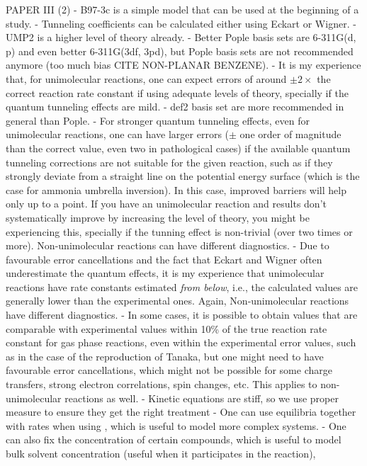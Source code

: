 PAPER III (2)
- B97-3c is a simple model that can be used at the beginning of a study.
- Tunneling coefficients can be calculated either using Eckart or Wigner.
- UMP2 is a higher level of theory already.
- Better Pople basis sets are 6-311G(d, p) and even better 6-311G(3df, 3pd),
but Pople basis sets are not recommended anymore (too much bias CITE NON-PLANAR BENZENE).
- It is my experience that, for unimolecular reactions, one can expect errors of around
$\pm 2 \times$ the correct reaction rate constant if using adequate levels of theory, specially if
the quantum tunneling effects are mild.
- def2 basis set are more recommended in general than Pople.
- For stronger quantum tunneling effects, even for unimolecular reactions, one can have larger errors
($\pm$ one order of magnitude than the correct value, even two in pathological cases) if the available quantum tunneling corrections are not suitable
for the given reaction, such as if they strongly deviate from a straight line on the potential energy surface
(which is the case for ammonia umbrella inversion).
In this case, improved barriers will help only up to a point.
If you have an unimolecular reaction
and results don't systematically improve by increasing the level of theory,
you might be experiencing this, specially if the tunning effect is non-trivial (over two times or more).
Non-unimolecular reactions can have different diagnostics.
- Due to favourable error cancellations and the fact that
Eckart and Wigner often underestimate the quantum effects,
it is my experience that unimolecular reactions
have rate constants estimated \emph{from below}, i.e.,
the calculated values are generally lower than the
experimental ones.
Again, Non-unimolecular reactions have different diagnostics.
- In some cases, it is possible to obtain
values that are comparable with experimental values within 10\% of
the true reaction rate constant for gas phase reactions,
even within the experimental error values, such as in the case
of the reproduction of Tanaka, but one might need to have favourable error cancellations,
which might not be possible for some charge transfers, strong electron correlations, spin changes, etc.
This applies to non-unimolecular reactions as well.
- Kinetic equations are stiff, so we use proper measure to ensure they get the right treatment
- One can use equilibria together with rates when using \overreact{},
which is useful to model more complex systems.
- One can also fix the concentration of certain compounds, which is useful
to model bulk solvent concentration (useful when it participates in the reaction),
